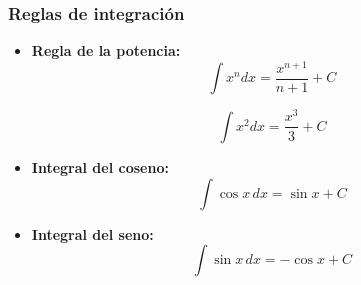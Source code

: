 \subsubsection{Reglas de integración}

\begin{itemize}

\item \textbf{Regla de la potencia:}
\[
\int x^n dx = \frac{x^{n+1}}{n+1} + C
\]

\[
\int x^2 dx = \frac{x^3}{3} + C
\]

\item \textbf{Integral del coseno:}
\[
\int \cos x \, dx = \sin x + C
\]

\item \textbf{Integral del seno:}
\[
\int \sin x \, dx = -\cos x + C
\]

\end{itemize}
